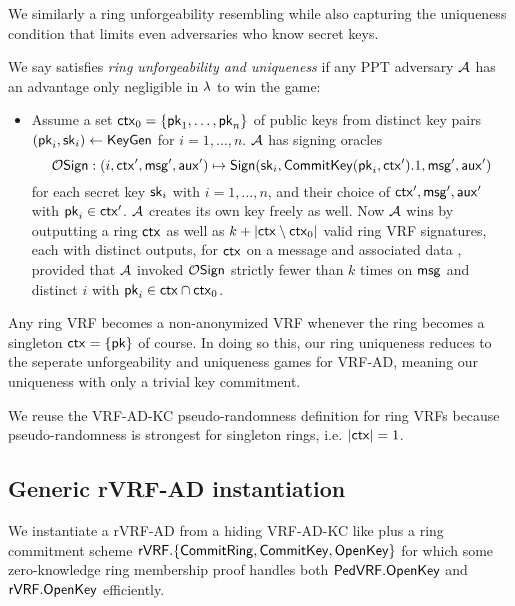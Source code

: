 We similarly a ring unforgeability resembling
 \cite[pp. 7 Def. 7]{cryptoeprint:2005:304} %
while also capturing the uniqueness condition that limits even adversaries who know secret keys.

\begin{definition}
We say \rVRF satisfies {\em ring unforgeability and uniqueness} if
any PPT adversary $\mathcal{A}$ has an advantage only
 negligible in $\lambda$ to win the game:
\begin{itemize}
\item[]
 Assume a set $\mathsf{ctx}_0 = \{ \mathsf{pk}_1,\ldots,\mathsf{pk}_n \}$ of public keys from
 distinct key pairs $(\mathsf{pk}_i,\mathsf{sk}_i) \leftarrow {\ensuremath{\mathsf{KeyGen}}}$ for $i=1,\ldots,n$.
 $\mathcal{A}$ has signing oracles
 $$ \mathcal{O}\mathsf{Sign} : (i,\mathsf{ctx}',\mathsf{msg}',\mathsf{aux}') \mapsto
  {\ensuremath{\mathsf{Sign}}}(\mathsf{sk}_i,{\mathsf{CommitKey}}(\mathsf{pk}_i,\mathsf{ctx}').1,\mathsf{msg}',\mathsf{aux}') $$
 for each secret key $\mathsf{sk}_i$ with $i=1,\ldots,n$, and
  their choice of $\mathsf{ctx}',\mathsf{msg}',\mathsf{aux}'$ with $\mathsf{pk}_i \in \mathsf{ctx}'$.
 $\mathcal{A}$ creates its own key freely as well.
 Now $\mathcal{A}$ wins by outputting a ring $\mathsf{ctx}$ as well as
 $k + |\mathsf{ctx} \setminus \mathsf{ctx}_0|$ valid ring VRF signatures,
  each with distinct outputs,    %
 for $\mathsf{ctx}$ on a message \msg and associated data \aux, provided that
 $\mathcal{A}$ invoked $\mathcal{O}\mathsf{Sign}$ strictly fewer than $k$ times on $\mathsf{msg}$  %
  and distinct $i$ with $\mathsf{pk}_i \in \mathsf{ctx} \cap \mathsf{ctx}_0$.
\end{itemize}
\end{definition}

Any ring VRF becomes a non-anonymized VRF whenever
 the ring becomes a singleton $\mathsf{ctx} = \{ \mathsf{pk} \}$ of course.
In doing so this, our ring uniqueness reduces to
 the seperate unforgeability and uniqueness games for VRF-AD,
meaning our uniqueness with only a trivial key commitment.

We reuse the VRF-AD-KC pseudo-randomness definition for ring VRFs
because pseudo-randomness is strongest for singleton rings, i.e. $|\mathsf{ctx}| = 1$.


\subsection{Generic rVRF-AD instantiation}

We instantiate a rVRF-AD from a hiding VRF-AD-KC like \PedVRF plus
a ring commitment scheme
 ${\mathsf{rVRF}}.\{ {\mathsf{CommitRing}}, {\mathsf{CommitKey}}, {\mathsf{OpenKey}} \}$
for which some zero-knowledge ring membership proof handles both
 ${\mathsf{PedVRF}}.{\mathsf{OpenKey}}$ and ${\mathsf{rVRF}}.{\mathsf{OpenKey}}$
efficiently.

